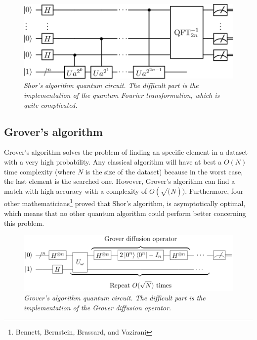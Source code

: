\documentclass[a4paper,12pt]{report}
\newcommand{\icite}[1]{\up{\textit{\cite{#1}}}}
\newcommand{\para}[1]{\par{#1}\\}
\begin{document}
\begin{figure}[H]
	\begin{center}
		\includegraphics[scale=0.3]{images/shor}
	\end{center}
	\caption{\textit{Shor's algorithm quantum circuit. The difficult part is the implementation of the quantum Fourier transformation, which is quite complicated. }}
	\label{shor}
\end{figure}

        \subsection{Grover's algorithm}

\para{
    Grover's\icite{bibli4} algorithm solves the problem of finding an specific element in a dataset with a very high probability. Any classical algorithm will have at best a $O(N)$ time complexity (where $N$ is the size of the dataset) because in the worst case, the last element is the searched one. However, Grover's algorithm can find a match with high accuracy with a complexity of $O(\sqrt(N))$. Furthermore, four other mathematicians\footnote{Bennett, Bernstein, Brassard, and Vazirani} proved that Shor's algorithm, is asymptotically optimal, which means that no other quantum algorithm could perform better concerning this problem.
}

\begin{figure}[H]
	\begin{center}
		\includegraphics[scale=0.3]{images/grover}
	\end{center}
	\caption{\textit{Grover's algorithm quantum circuit. The difficult part is the implementation of the Grover diffusion operator. }}
	\label{grover}
\end{figure}
\end{document}
